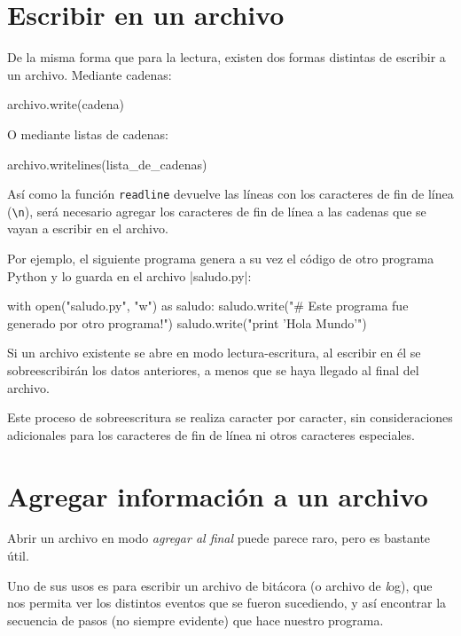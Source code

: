 \section{Escribir en un archivo}

De la misma forma que para la lectura, existen dos formas distintas de
escribir a un archivo.  Mediante cadenas:

\begin{codigo-python-sn}
archivo.write(cadena)
\end{codigo-python-sn}

O mediante listas de cadenas:

\begin{codigo-python-sn}
archivo.writelines(lista_de_cadenas)
\end{codigo-python-sn}

Así como la función \lstinline!readline! devuelve las líneas con los caracteres
de fin de línea (\lstinline!\n!), será necesario agregar los caracteres de
fin de línea a las cadenas que se vayan a escribir en el archivo.

Por ejemplo, el siguiente programa genera a su vez el código de otro programa
Python y lo guarda en el archivo |saludo.py|:

\begin{codigo-python-sn}
with open("saludo.py", "w") as saludo:
    saludo.write("# Este programa fue generado por otro programa!\n")
    saludo.write("print 'Hola Mundo'\n")
\end{codigo-python-sn}

\begin{atencion}
Si un archivo existente se abre en modo lectura-escritura, al escribir en
él se sobreescribirán los datos anteriores, a menos que se haya llegado al
final del archivo.

Este proceso de sobreescritura se realiza caracter por caracter, sin
consideraciones adicionales para los caracteres de fin de línea ni otros
caracteres especiales.
\end{atencion}

\section{Agregar información a un archivo}

Abrir un archivo en modo {\it agregar al final} puede parece raro,
pero es bastante útil.

Uno de sus usos es para escribir un archivo de bitácora (o archivo de
{\textit log}), que nos permita ver los distintos eventos que se fueron
sucediendo, y así encontrar la secuencia de pasos (no siempre evidente) que
hace nuestro programa.

